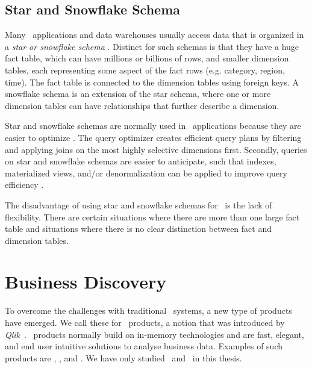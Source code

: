 \subsection{Star and Snowflake Schema}
\label{sub:Star and Snowflake Schema}
Many \bi~applications and data warehouses usually access data that is organized in a \textit{star or snowflake schema} \cite{Barber2012-xt}. Distinct for such schemas is that they have a huge fact table, which can have millions or billions of rows, and smaller dimension tables, each representing some aspect of the fact rows (e.g. category, region, time). The fact table is connected to the dimension tables using foreign keys. A snowflake schema is an extension of the star schema, where one or more dimension tables can have relationships that further describe a dimension.

Star and snowflake schemas are normally used in \bi~applications because they are easier to optimize \cite{Lamb2012-kg}. The query optimizer creates efficient query plans by filtering and applying joins on the most highly selective dimensions first. Secondly, queries on star and snowflake schemas are easier to anticipate, such that indexes, materialized views, and/or denormalization can be applied to improve query efficiency \cite{Barber2012-xt}.

The disadvantage of using star and snowflake schemas for \bi~is the lack of flexibility. There are certain situations where there are more than one large fact table and situations where there is no clear distinction between fact and dimension tables.

\section{Business Discovery}
\label{sec:Business Discovery}

To overcome the challenges with traditional \bi~systems, a new type of products have emerged. We call these for \bd~products, a notion that was introduced by \textit{Qlik}~\cite{Qlik2014-vd}. \bd~products normally build on in-memory technologies and are fast, elegant, and end user intuitive solutions to analyse business data. Examples of such products are \powerpivot, \tableau, and \qlikview. We have only studied \qlikview~and \tableau~in this thesis.


